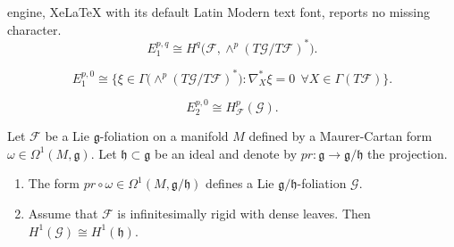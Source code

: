 \documentclass[10pt,a4paper]{amsart}
\begin{document}
engine, XeLaTeX with its default Latin Modern text font, reports no missing character.
	\begin{equation}\label{eq:E_1}
		E_1^{p,q}\cong H^{q}\big(\mathcal{F},\wedge^{p}(T\mathcal{G}/T\mathcal{F})^{*}\big).
	\end{equation}

	\begin{equation}\label{eq:E_1p}
		E_1^{p,0}\cong\big\{\xi\in\Gamma\big(\wedge^{p}(T\mathcal{G}/T\mathcal{F})^{*}\big):\nabla_X^{*}\xi=0\ \ \forall X\in\Gamma(T\mathcal{F})\big\}.
	\end{equation}

	\begin{equation}\label{eq:bas-coho}
		E_2^{p,0}\cong H^{p}_{\mathcal{F}}(\mathcal{G}).
	\end{equation}

	\begin{prop}\label{prop:spectral}
		Let $\mathcal{F}$ be a Lie $\mathfrak{g}$-foliation on a manifold $M$ defined by a Maurer-Cartan form $\omega\in\Omega^{1}(M,\mathfrak{g})$. Let $\mathfrak{h}\subset\mathfrak{g}$ be an ideal and denote by $pr:\mathfrak{g}\rightarrow \mathfrak{g}/\mathfrak{h}$ the projection. 
		\begin{enumerate}
			\item The form $pr\circ\omega\in\Omega^{1}(M,\mathfrak{g}/\mathfrak{h})$ defines a Lie $\mathfrak{g}/\mathfrak{h}$-foliation $\mathcal{G}$.
			\item Assume that $\mathcal{F}$ is infinitesimally rigid with dense leaves. Then $H^{1}(\mathcal{G})\cong H^{1}(\mathfrak{h})$.
		\end{enumerate}
	\end{prop}
\end{document}
